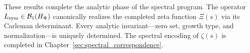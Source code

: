 \medskip
\noindent
These results complete the analytic phase of the spectral program. The operator \( L_{\mathrm{sym}} \in \mathcal{B}_1(H_{\Psi}) \) canonically realizes the completed zeta function \( \Xi(s) \) via its Carleman determinant. Every analytic invariant—zero set, growth type, and normalization—is uniquely determined. The spectral encoding of \( \zeta(s) \) is completed in Chapter~\ref{sec:spectral_correspondence}.
